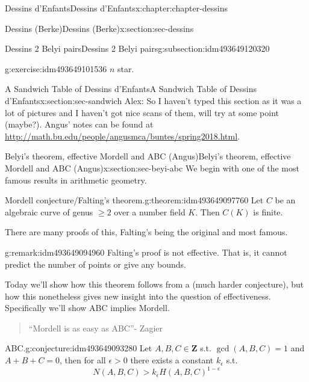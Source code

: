 \documentclass[oneside,10pt,]{book}
\numberwithin{equation}{section}
\newcommand{\ZZ}{\mathbf{Z}}
\newcommand{\gt}{>}
\begin{document}
\begin{chapterptx}{Dessins d'Enfants}{}{Dessins d'Enfants}{}{}{x:chapter:chapter-dessins}
\begin{sectionptx}{Dessins (Berke)}{}{Dessins (Berke)}{}{}{x:section:sec-dessins}
\begin{subsectionptx}{Dessins 2 Belyi pairs}{}{Dessins 2 Belyi pairs}{}{}{g:subsection:idm493649120320}
\begin{inlineexercise}{}{g:exercise:idm493649101536}
\(n\) star.%
\end{inlineexercise}
\end{subsectionptx}
\end{sectionptx}
%
%
\typeout{************************************************}
\typeout{************************************************}
%
\begin{sectionptx}{A Sandwich Table of Dessins d'Enfants}{}{A Sandwich Table of Dessins d'Enfants}{}{}{x:section:sec-sandwich}
Alex: So I haven't typed this section as it was a lot of pictures and I haven't got nice scans of them, will try at some point (maybe?). Angus' notes can be found at \url{http://math.bu.edu/people/angusmca/buntes/spring2018.html}.%
\end{sectionptx}
%
%
\typeout{************************************************}
\typeout{************************************************}
%
\begin{sectionptx}{Belyi's theorem, effective Mordell and ABC (Angus)}{}{Belyi's theorem, effective Mordell and ABC (Angus)}{}{}{x:section:sec-beyi-abc}
We begin with one of the most famous results in arithmetic geometry.%
\begin{theorem}{Mordell conjecture\slash{}Falting's theorem.}{}{g:theorem:idm493649097760}%
Let \(C\) be an algebraic curve of genus \(\ge 2\) over a number field \(K\). Then \(C(K)\) is finite.%
\end{theorem}
There are many proofs of this, Falting's being the original and most famous.%
\begin{remark}{}{g:remark:idm493649094960}%
Falting's proof is not effective. That is, it cannot predict the number of points or give any bounds.%
\end{remark}
Today we'll show how this theorem follows from a (much harder conjecture), but how this nonetheless gives new insight into the question of effectiveness. Specifically we'll show ABC implies Mordell.%
\begin{quote}%
``Mordell is as easy as ABC''- Zagier%
\end{quote}
\begin{conjecture}{ABC.}{}{g:conjecture:idm493649093280}%
Let \(A,B,C\in \ZZ\) s.t. \(\gcd(A,B,C)  =1 \) and \(A+B+C=0\), then for all \(\epsilon \gt 0\) there exists a constant \(k_\epsilon\) s.t.%
\begin{equation*}
N(A,B,C) \gt k_\epsilon H(A,B,C)^{1-\epsilon}
\end{equation*}

\end{conjecture}
\end{sectionptx}
\end{chapterptx}
\end{document}
